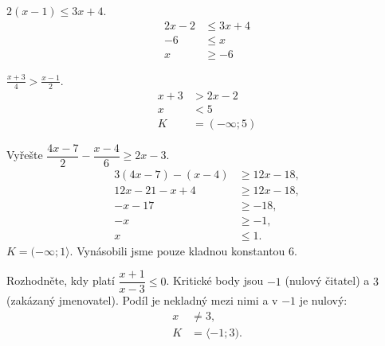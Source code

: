 \documentclass[11pt,a4paper]{article}
\begin{document}
\begin{zadaniReseniBox}[title={Samostatná práce 1}]
$2(x-1)\le3x+4$.
\tcblower
\begin{align*}
2x-2&\le3x+4 \\
 -6&\le x \\
 x&\ge-6
\end{align*}
\end{zadaniReseniBox}
\begin{zadaniReseniBox}[title={Samostatná práce 2}]
$\frac{x+3}{4}>\frac{x-1}{2}$.
\tcblower
\begin{align*}
x+3&>2x-2 \\
 x&<5 \\
 K&=(-\infty;5)
\end{align*}
\end{zadaniReseniBox}

\begin{zadaniReseniBox}[title={Samostatná práce 3}]
Vyřešte $\dfrac{4x-7}{2}-\dfrac{x-4}{6}\ge2x-3$.
\tcblower
\begin{align*}
3(4x-7)-(x-4)&\ge12x-18,\\
12x-21-x+4&\ge12x-18,\\
-x-17&\ge-18,\\
-x&\ge-1,\\
x&\le1.
\end{align*}
$K=(-\infty;1\rangle$. Vynásobili jsme pouze kladnou konstantou $6$.
\end{zadaniReseniBox}

\begin{zadaniReseniBox}[title={Rozšíření 1}]
Rozhodněte, kdy platí $\dfrac{x+1}{x-3}\le0$.
\tcblower
Kritické body jsou $-1$ (nulový čitatel) a $3$ (zakázaný jmenovatel). Podíl je nekladný mezi nimi a v $-1$ je nulový:
\begin{align*}
 x&\ne3,\\
 K&=\langle-1;3).
\end{align*}
\end{zadaniReseniBox}
\end{document}
